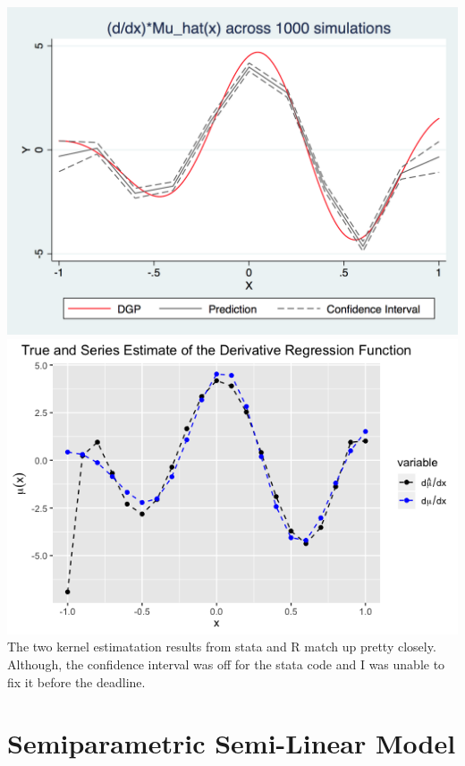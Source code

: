 \documentclass[12pt]{article}
\begin{document}
\subsubsection{}
\includegraphics[totalheight=4cm]{pset2q2d.png}
\includegraphics[totalheight=4cm]{pset2q2d_r.png}\\
The two kernel estimatation results from stata and R match up pretty closely. Although, the confidence interval was off for the stata code and I was unable to fix it before the deadline.
\newpage
\section{Semiparametric Semi-Linear Model}
\subsection{}
\end{document}
